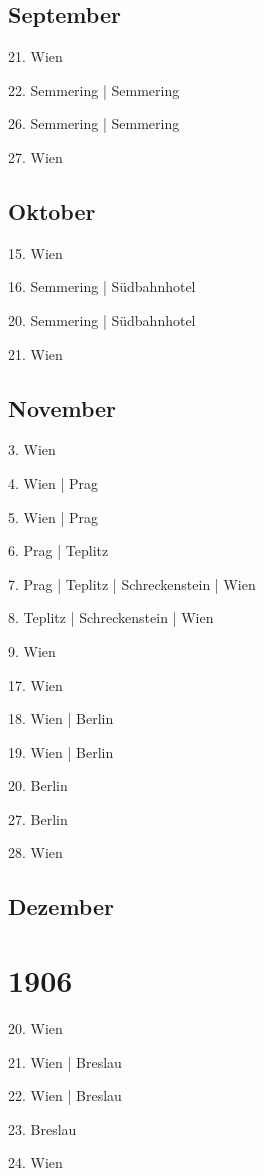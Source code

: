 \documentclass[twoside=false,titlepage=false,open=any, parskip=never, fontsize=10pt, headings=small, chapterprefix=false, appendixprefix=false, DIV=15]{scrbook}
\begin{document}
\begin{multicols}{3}
            \section*{September}
            21. Wien\par
            22. Semmering | Semmering\par
            26. Semmering | Semmering\par
            27. Wien\par
            \section*{Oktober}
            15. Wien\par
            16. Semmering | Südbahnhotel\par
            20. Semmering | Südbahnhotel\par
            21. Wien\par
            \section*{November}
            3. Wien\par
            4. Wien | Prag\par
            5. Wien | Prag\par
            6. Prag | Teplitz\par
            7. Prag | Teplitz | Schreckenstein | Wien\par
            8. Teplitz | Schreckenstein | Wien\par
            9. Wien\par
            17. Wien\par
            18. Wien | Berlin\par
            19. Wien | Berlin\par
            20. Berlin\par
            27. Berlin\par
            28. Wien\par
            \section*{Dezember}
            \chapter*{1906}
            20. Wien\par
            21. Wien | Breslau\par
            22. Wien | Breslau\par
            23. Breslau\par
            24. Wien\par

\end{multicols}
\end{document}
